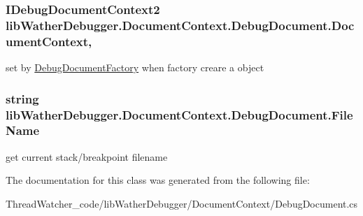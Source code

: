 \hypertarget{classlib_wather_debugger_1_1_document_context_1_1_debug_document_a93f0e326cd96b71ef0bc927bdea63049}{
\subsubsection[{Document\+Context}]{\setlength{\rightskip}{0pt plus 5cm}I\+Debug\+Document\+Context2 lib\+Wather\+Debugger.\+Document\+Context.\+Debug\+Document.\+Document\+Context\hspace{0.3cm}{\ttfamily [get]}, {\ttfamily [set]}}}\label{classlib_wather_debugger_1_1_document_context_1_1_debug_document_a93f0e326cd96b71ef0bc927bdea63049}


set by \hyperlink{classlib_wather_debugger_1_1_document_context_1_1_debug_document_factory}{Debug\+Document\+Factory} when factory creare a object 

\hypertarget{classlib_wather_debugger_1_1_document_context_1_1_debug_document_adff9995f07c21a4cdecca746742b5afe}{
\subsubsection[{File\+Name}]{\setlength{\rightskip}{0pt plus 5cm}string lib\+Wather\+Debugger.\+Document\+Context.\+Debug\+Document.\+File\+Name\hspace{0.3cm}{\ttfamily [get]}}}\label{classlib_wather_debugger_1_1_document_context_1_1_debug_document_adff9995f07c21a4cdecca746742b5afe}


get current stack/breakpoint filename 



The documentation for this class was generated from the following file\+:\begin{DoxyCompactItemize}
\item 
Thread\+Watcher\+\_\+code/lib\+Wather\+Debugger/\+Document\+Context/Debug\+Document.\+cs\end{DoxyCompactItemize}
